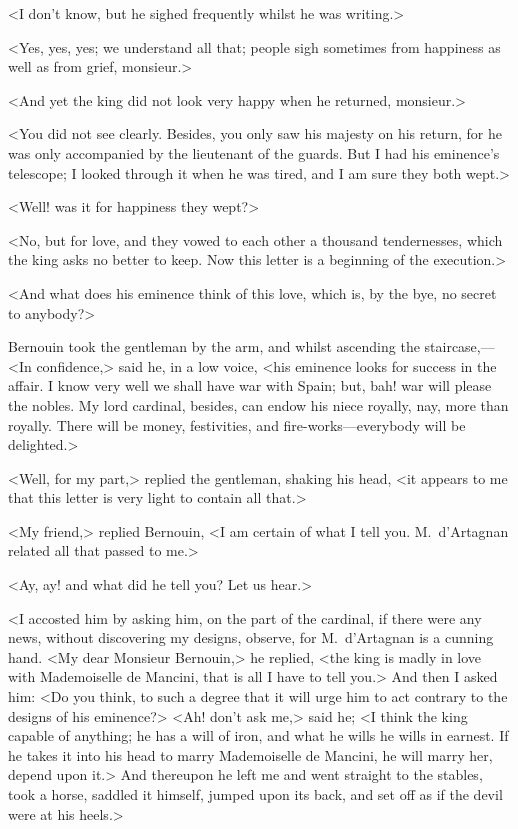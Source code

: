 <I don't know, but he sighed frequently whilst he was writing.>

<Yes, yes, yes; we understand all that; people sigh sometimes from happiness as well as from grief, monsieur.>

<And yet the king did not look very happy when he returned, monsieur.>

<You did not see clearly. Besides, you only saw his majesty on his return, for he was only accompanied by the lieutenant of the guards. But I had his eminence's telescope; I looked through it when he was tired, and I am sure they both wept.>

<Well! was it for happiness they wept?>

<No, but for love, and they vowed to each other a thousand tendernesses, which the king asks no better to keep. Now this letter is a beginning of the execution.>

<And what does his eminence think of this love, which is, by the bye, no secret to anybody?>

Bernouin took the gentleman by the arm, and whilst ascending the staircase,—<In confidence,> said he, in a low voice, <his eminence looks for success in the affair. I know very well we shall have war with Spain; but, bah! war will please the nobles. My lord cardinal, besides, can endow his niece royally, nay, more than royally. There will be money, festivities, and fire-works—everybody will be delighted.>

<Well, for my part,> replied the gentleman, shaking his head, <it appears to me that this letter is very light to contain all that.>

<My friend,> replied Bernouin, <I am certain of what I tell you. M.~d'Artagnan related all that passed to me.>

<Ay, ay! and what did he tell you? Let us hear.>

<I accosted him by asking him, on the part of the cardinal, if there were any news, without discovering my designs, observe, for M.~d'Artagnan is a cunning hand. <My dear Monsieur Bernouin,> he replied, <the king is madly in love with Mademoiselle de Mancini, that is all I have to tell you.> And then I asked him: <Do you think, to such a degree that it will urge him to act contrary to the designs of his eminence?> <Ah! don't ask me,> said he; <I think the king capable of anything; he has a will of iron, and what he wills he wills in earnest. If he takes it into his head to marry Mademoiselle de Mancini, he will marry her, depend upon it.> And thereupon he left me and went straight to the stables, took a horse, saddled it himself, jumped upon its back, and set off as if the devil were at his heels.>

